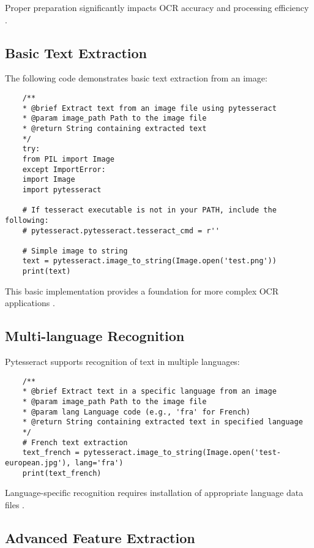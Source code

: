 Proper preparation significantly impacts OCR accuracy and processing efficiency \cite{DataCamp:2024}.

\subsection{Basic Text Extraction}
\label{subsec:basic_extraction}

The following code demonstrates basic text extraction from an image:

\begin{verbatim}
	/**
	* @brief Extract text from an image file using pytesseract
	* @param image_path Path to the image file
	* @return String containing extracted text
	*/
	try:
	from PIL import Image
	except ImportError:
	import Image
	import pytesseract
	
	# If tesseract executable is not in your PATH, include the following:
	# pytesseract.pytesseract.tesseract_cmd = r''
	
	# Simple image to string
	text = pytesseract.image_to_string(Image.open('test.png'))
	print(text)
\end{verbatim}

This basic implementation provides a foundation for more complex OCR applications \cite{Nutrient.io:2025}.

\subsection{Multi-language Recognition}
\label{subsec:multilanguage}

Pytesseract supports recognition of text in multiple languages:

\begin{verbatim}
	/**
	* @brief Extract text in a specific language from an image
	* @param image_path Path to the image file
	* @param lang Language code (e.g., 'fra' for French)
	* @return String containing extracted text in specified language
	*/
	# French text extraction
	text_french = pytesseract.image_to_string(Image.open('test-european.jpg'), lang='fra')
	print(text_french)
\end{verbatim}

Language-specific recognition requires installation of appropriate language data files \cite{Anitha:2024}.

\subsection{Advanced Feature Extraction}
\label{subsec:advanced_extraction}

